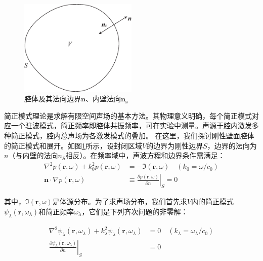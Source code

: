 \begin{figure}[h!]
  \centering
  \includegraphics[width=0.5\textwidth]{images/fig2-4.eps} 
  \caption{腔体及其法向边界$\mathbf{n}$、内壁法向$\mathbf{n_s}$}
  \label{fig_2_4}
\end{figure}

简正模式理论是求解有限空间声场的基本方法。其物理意义明确，每个简正模式对应一个驻波模式，简正频率即腔体共振频率，可在实验中测量。声源于腔内激发多种简正模式，腔内总声场为各激发模式的叠加。 在这里，我们探讨刚性壁面腔体的简正模式和展开。如图\ref{fig_2_4}所示，设封闭区域$V$的边界为刚性边界$S$，边界的法向为$n$（与内壁的法向$n_S$相反）。在频率域中，声波方程和边界条件需满足：
\begin{equation}\label{eq2-27}
  \begin{split}
  \nabla^{2}p(\mathbf{r},\omega)+k_{0}^{2}p(\mathbf{r},\omega)&=-\mathfrak{I}(\mathbf{r},\omega)\quad(k_{0}=\omega/c_{0})\\
  \mathbf{n}\cdot\nabla p(\mathbf{r},\omega)&\equiv\left.\frac{\partial p(\mathbf{r},\omega)}{\partial n}\right|_{S}=0
  \end{split}
\end{equation}

其中，$\mathfrak{I}(\mathbf{r},\omega)$是体源分布。为了求声场分布，我们首先求$V$内的简正模式$\psi_{\lambda}(\mathbf{r},\omega_{\lambda})$和简正频率$\omega_{\lambda}$，它们是下列齐次问题的非零解：

\begin{equation}\label{eq2-28}
  \begin{split}
  \nabla^{2}\psi_{\lambda}(\mathbf{r},\omega_{\lambda})+k_{\lambda}^{2}\psi_{\lambda}(\mathbf{r},\omega_{\lambda})&=0\quad(k_{\lambda}=\omega_{\lambda}/c_{0})\\
  \left.\frac{\partial\psi_{\lambda}(\mathbf{r},\omega_{\lambda})}{\partial n}\right|_{S}&=0
  \end{split}
  \end{equation}

